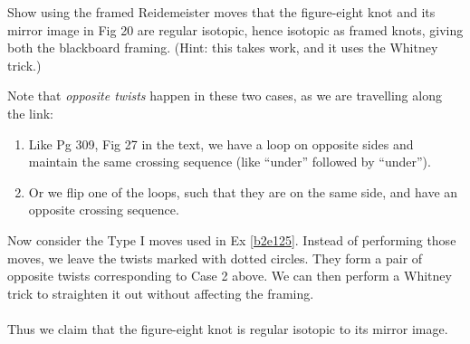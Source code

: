 \documentclass[10pt]{article}
\begin{document}
\begin{example}\label{b2e129}
	Show using the framed Reidemeister moves that the figure-eight knot and its mirror image in Fig 20 are regular isotopic, hence isotopic as framed knots, giving both the blackboard framing. (Hint: this takes work, and it uses the Whitney trick.)
\end{example}
\sol Note that \emph{opposite twists} happen in these two cases, as we are travelling along the link:
\begin{enumerate}
	\item Like Pg 309, Fig 27 in the text, we have a loop on opposite sides and maintain the same crossing sequence (like ``under'' followed by ``under'').
	\item Or we flip one of the loops, such that they are on the same side, and have an opposite crossing sequence.
\end{enumerate}
Now consider the Type I moves used in Ex \ref{b2e125}. Instead of performing those moves, we leave the twists marked with dotted circles. They form a pair of opposite twists corresponding to Case 2 above. We can then perform a Whitney trick to straighten it out without affecting the framing.\\\\
Thus we claim that the figure-eight knot is regular isotopic to its mirror image.
\end{document}

